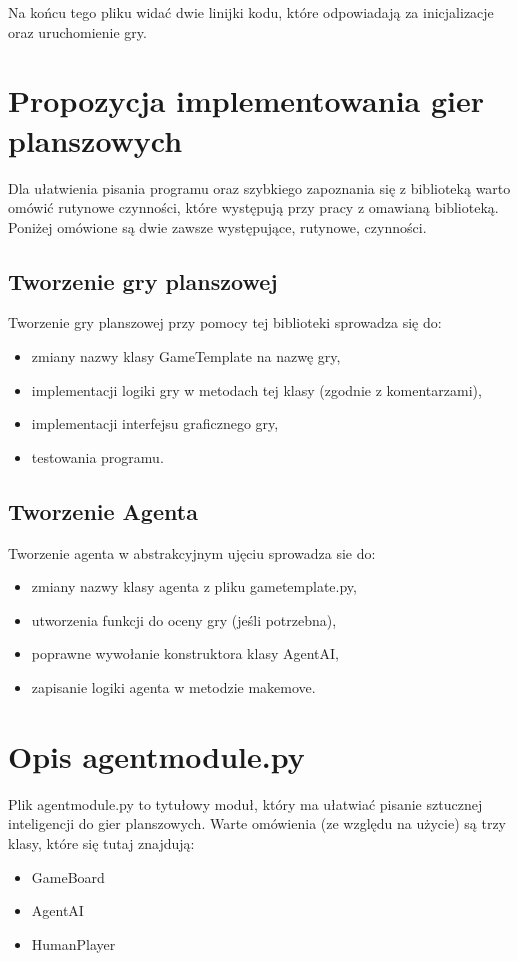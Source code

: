 \documentclass[polish,shortabstract,inz]{iithesis}
\begin{document}
Na końcu tego pliku widać dwie linijki kodu, które odpowiadają za inicjalizacje oraz uruchomienie gry.
\section{Propozycja implementowania gier planszowych}
Dla ułatwienia pisania programu oraz szybkiego zapoznania się z biblioteką warto omówić rutynowe czynności, które występują przy pracy z omawianą biblioteką.
Poniżej omówione są dwie zawsze występujące, rutynowe, czynności.
\subsection{Tworzenie gry planszowej}
Tworzenie gry planszowej przy pomocy tej biblioteki sprowadza się do:
\begin{itemize}
  \item zmiany nazwy klasy GameTemplate na nazwę gry,
  \item implementacji logiki gry w metodach tej klasy (zgodnie z komentarzami),
  \item implementacji interfejsu graficznego gry,
  \item testowania programu.
\end{itemize}

\subsection{Tworzenie Agenta}
Tworzenie agenta w abstrakcyjnym ujęciu sprowadza sie do:
\begin{itemize}
  \item zmiany nazwy klasy agenta z pliku game\textunderscore template.py,
  \item utworzenia funkcji do oceny gry (jeśli potrzebna),
  \item poprawne wywołanie konstruktora klasy AgentAI,
  \item zapisanie logiki agenta w metodzie make\textunderscore move.
\end{itemize}

\section{Opis agent\textunderscore module.py}
Plik agent\textunderscore module.py to tytułowy moduł, który ma ułatwiać pisanie sztucznej inteligencji do gier planszowych.
Warte omówienia (ze względu na użycie) są trzy klasy, które się tutaj znajdują:
\begin{itemize}
  \item GameBoard
  \item AgentAI
  \item HumanPlayer
\end{itemize}
\end{document}
